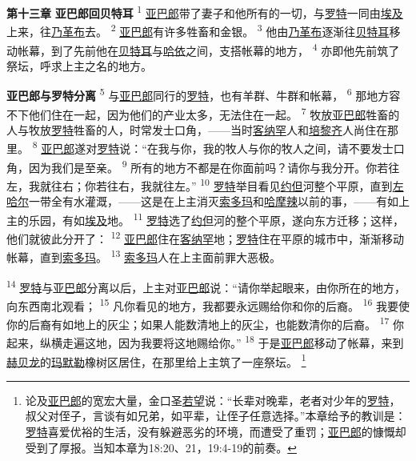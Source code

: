 \textbf{第十三章 }
\textbf{亚巴郎回贝特耳 }
\textsuperscript{1}
\uline{亚巴郎}带了妻子和他所有的一切，与\uline{罗特}一同由\uline{埃及}上来，往\uline{乃革布}去。
\textsuperscript{2}
\uline{亚巴郎}有许多牲畜和金银。
\textsuperscript{3}
他由\uline{乃革布}逐渐往\uline{贝特耳}移动帐幕，到了先前他在\uline{贝特耳}与\uline{哈依}之间，支搭帐幕的地方，
\textsuperscript{4}
亦即他先前筑了祭坛，呼求上主之名的地方。

\textbf{亚巴郎与罗特分离 }
\textsuperscript{5}
与\uline{亚巴郎}同行的\uline{罗特}，也有羊群、牛群和帐幕，
\textsuperscript{6}
那地方容不下他们住在一起，因为他们的产业太多，无法住在一起。
\textsuperscript{7}
牧放\uline{亚巴郎}牲畜的人与牧放\uline{罗特}牲畜的人，时常发士口角，——当时\uline{客纳罕}人和\uline{培黎齐}人尚住在那里。
\textsuperscript{8}
\uline{亚巴郎}遂对\uline{罗特}说：“在我与你，我的牧人与你的牧人之间，请不要发士口角，因为我们是至亲。
\textsuperscript{9}
所有的地方不都是在你面前吗？请你与我分开。你若往左，我就往右；你若往右，我就往左。”
\textsuperscript{10}
\uline{罗特}举目看见\uline{约但}河整个平原，直到\uline{左哈尔}一带全有水灌溉，——这是在上主消灭\uline{索多玛}和\uline{哈摩辣}以前的事，——有如上主的乐园，有如\uline{埃及}地。
\textsuperscript{11}
\uline{罗特}选了\uline{约但}河的整个平原，遂向东方迁移；这样，他们就彼此分开了：
\textsuperscript{12}
\uline{亚巴郎}住在\uline{客纳罕}地；\uline{罗特}住在平原的城市中，渐渐移动帐幕，直到\uline{索多玛}。
\textsuperscript{13}
\uline{索多玛}人在上主面前罪大恶极。

\textsuperscript{14}
\uline{罗特}与\uline{亚巴郎}分离以后，上主对\uline{亚巴郎}说：“请你举起眼来，由你所在的地方，向东西南北观看；
\textsuperscript{15}
凡你看见的地方，我都要永远赐给你和你的后裔。
\textsuperscript{16}
我要使你的后裔有如地上的灰尘；如果人能数清地上的灰尘，也能数清你的后裔。
\textsuperscript{17}
你起来，纵横走遍这地，因为我要将这地赐给你。”
\textsuperscript{18}
于是\uline{亚巴郎}移动了帐幕，来到\uline{赫贝龙}的\uline{玛默勒}橡树区居住，在那里给上主筑了一座祭坛。
\footnote{论及\uline{亚巴郎}的宽宏大量，金口圣\uline{若望}说：“长辈对晚辈，老者对少年的\uline{罗特}，叔父对侄子，言谈有如兄弟，如平辈，让侄子任意选择。”本章给予的教训是：\uline{罗特}喜爱优裕的生活，没有躲避恶劣的环境，而遭受了重罚；\uline{亚巴郎}的慷慨却受到了厚报。当知本章为18:20、21，19:4-19的前奏。}

